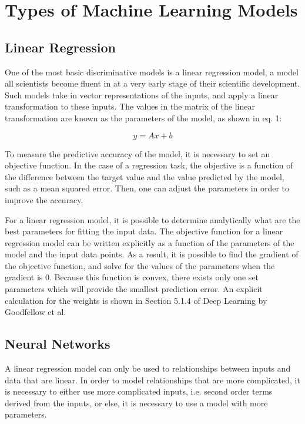 \section{Types of Machine Learning Models} 

\subsection{Linear Regression}

One of the most basic discriminative models is a linear regression model, a model all scientists become fluent in at a very early stage of their scientific development. Such models take in vector representations of the inputs, and apply a linear transformation to these inputs. The values in the matrix of the linear transformation are known as the parameters of the model, as shown in eq. 1:

\begin{equation}
  y = Ax + b
\end{equation}

To measure the predictive accuracy of the model, it is necessary to set an objective function. In the case of a regression task, the objective is a function of the difference between the target value and the value predicted by the model, such as a mean squared error. Then, one can adjust the parameters in order to improve the accuracy.

For a linear regression model, it is possible to determine analytically what are the best parameters for fitting the input data. The objective function for a linear regression model can be written explicitly as a function of the parameters of the model and the input data points. As a result, it is possible to find the gradient of the objective function, and solve for the values of the parameters when the gradient is 0. Because this function is convex, there exists only one set parameters which will provide the smallest prediction error. An explicit calculation for the weights is shown in Section 5.1.4 of Deep Learning by Goodfellow et al. \cite{Goodfellow-et-al-2016}

\subsection{Neural Networks}

A linear regression model can only be used to relationships between inputs and data that are linear. In order to model relationships that are more complicated, it is necessary to either use more complicated inputs, i.e. second order terms derived from the inputs, or else, it is necessary to use a model with more parameters.

